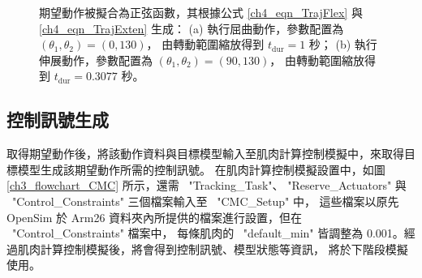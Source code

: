 \clearpage

\begin{figure}[!ht]
	\centering
    \caption[期望動作生成範例]{期望動作被擬合為正弦函數，其根據公式 \ref{ch4_eqn_TrajFlex} 與 \ref{ch4_eqn_TrajExten} 生成：
                             (a) 執行屈曲動作，參數配置為 $(\theta_1, \theta_2)=(0,130)$，
                             由轉動範圍縮放得到 $t_\mathrm{dur} = 1 $ 秒；
                             (b) 執行伸展動作，參數配置為 $(\theta_1, \theta_2)=(90,130)$，
                             由轉動範圍縮放得到 $t_\mathrm{dur} = 0.3077 $ 秒。}
    \label{ch4_fig_DesiredTrajExample}
\end{figure}

\subsection{控制訊號生成}
取得期望動作後，將該動作資料與目標模型輸入至肌肉計算控制模擬中，來取得目標模型生成該期望動作所需的控制訊號。
在肌肉計算控制模擬設置中，如圖 \ref{ch3_flowchart_CMC} 所示，還需 \ "Tracking\_Task"、
"Reserve\_Actuators" 與 \ "Control\_Constraints" 三個檔案輸入至 \ "CMC\_Setup" 中，
這些檔案以原先 OpenSim 於 Arm26 資料夾內所提供的檔案進行設置，但在 \ "Control\_Constraints" 檔案中，
每條肌肉的 \ "default\_min" 皆調整為 0.001。經過肌肉計算控制模擬後，將會得到控制訊號、模型狀態等資訊，
將於下階段模擬使用。

